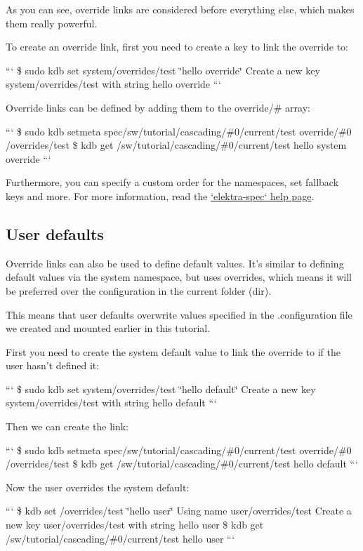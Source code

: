 As you can see, override links are considered before everything else, which makes them really powerful.

To create an override link, first you need to create a key to link the override to\+:

``` \$ sudo kdb set system/overrides/test \char`\"{}hello override\char`\"{} Create a new key system/overrides/test with string hello override ```

Override links can be defined by adding them to the {\ttfamily override/\#} array\+:

``` \$ sudo kdb setmeta spec/sw/tutorial/cascading/\#0/current/test override/\#0 /overrides/test \$ kdb get /sw/tutorial/cascading/\#0/current/test hello system override ```

Furthermore, you can specify a custom order for the namespaces, set fallback keys and more. For more information, read the \hyperlink{md_doc_help_elektra-spec_doc_help_elektra-spec_md}{`elektra-\/spec` help page}.

\subsection*{User defaults}

Override links can also be used to define default values. It's similar to defining default values via the {\ttfamily system} namespace, but uses overrides, which means it will be preferred over the configuration in the current folder ({\ttfamily dir}).

This means that user defaults overwrite values specified in the {\ttfamily .configuration} file we created and mounted earlier in this tutorial.

First you need to create the system default value to link the override to if the user hasn't defined it\+:

``` \$ sudo kdb set system/overrides/test \char`\"{}hello default\char`\"{} Create a new key system/overrides/test with string hello default ```

Then we can create the link\+:

``` \$ sudo kdb setmeta spec/sw/tutorial/cascading/\#0/current/test override/\#0 /overrides/test \$ kdb get /sw/tutorial/cascading/\#0/current/test hello default ```

Now the user overrides the system default\+:

``` \$ kdb set /overrides/test \char`\"{}hello user\char`\"{} Using name user/overrides/test Create a new key user/overrides/test with string hello user \$ kdb get /sw/tutorial/cascading/\#0/current/test hello user ``` 